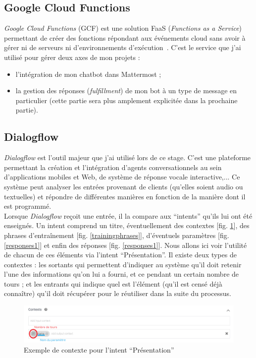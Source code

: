 \documentclass[stage2a]{tnreport} %
\begin{document}
\subsection{Google Cloud Functions}
\emph{Google Cloud Functions} (GCF) est une solution FaaS (\emph{Functions as a Service}) permettant de créer des fonctions répondant aux événements cloud sans avoir à gérer ni de serveurs ni d'environnements d'exécution~\cite{GCF}. C'est le service que j'ai utilisé pour gérer deux axes de mon projets : \\
\begin{itemize}
    \item l'intégration de mon chatbot dans Mattermost ;
    \item la gestion des réponses (\emph{fulfillment}) de mon bot à un type de message en particulier (cette partie sera plus amplement explicitée dans la prochaine partie).
\end{itemize}
\subsection{Dialogflow}
\emph{Dialogflow} est l'outil majeur que j'ai utilisé lors de ce stage. C'est une plateforme permettant la création et l'intégration d'agents conversationnels au sein d'applications mobiles et Web, de système de réponse vocale interactive,... Ce système peut analyser les entrées provenant de clients (qu'elles soient audio ou textuelles) et répondre de différentes manières en fonction de la manière dont il est programmé. \\

Lorsque \emph{Dialogflow} reçoit une entrée, il la compare aux ``intents'' qu'ils lui ont été enseignés. Un intent comprend un titre, éventuellement des contextes [fig. \ref{contexts}], des phrases d'entraînement [fig. \ref{trainingphrases}], d'éventuels paramètres [fig. \ref{responses1}] et enfin des réponses [fig. \ref{responses1}]. Nous allons ici voir l'utilité de chacun de ces éléments via l'intent ``Présentation''. Il existe deux types de contextes : les sortants qui permettent d'indiquer au système qu'il doit retenir l'une des informations qu'on lui a fourni, et ce pendant un certain nombre de tours ; et les entrants qui indique quel est l'élément (qu'il est censé déjà connaître) qu'il doit récupérer pour le réutiliser dans la suite du processus. \\
\begin{figure}[h!]
    \centering
    \includegraphics[width=\textwidth]{figures/contexts.PNG}
    \caption{Exemple de contexte pour l'intent ``Présentation''}
    \label{contexts}
\end{figure}
\end{document}
